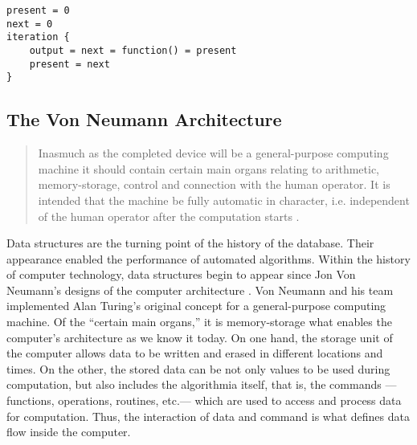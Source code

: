 \begin{flushleft}
\small
\begin{lstlisting}[caption={Pseudocode showing a routine whose next value depends on the present value.},captionpos=b,label={lst:neumann}]
present = 0
next = 0
iteration {
	output = next = function() = present
	present = next
}
\end{lstlisting}
\end{flushleft}


\subsection{The Von Neumann Architecture}

\begin{quote}
	Inasmuch as the completed device will be a general-purpose computing machine it should contain certain main organs relating to arithmetic, memory-storage, control and connection with the human operator. It is intended that the machine be fully automatic in character, i.e. independent of the human operator after the computation starts \parencite[1]{von46:Pre}.
\end{quote}

Data structures are the turning point of the history of the database. Their appearance enabled the performance of automated algorithms. Within the history of computer technology, data structures begin to appear since Jon Von Neumann's designs of the computer architecture \parencite{von46:Pre}. Von Neumann and his team implemented Alan Turing's original concept for a general-purpose computing machine. Of the ``certain main organs,'' it is memory-storage what enables the computer's architecture as we know it today. On one hand, the storage unit of the computer allows data to be written and erased in different locations and times. On the other, the stored data can be not only values to be used during computation, but also includes the algorithmia itself, that is, the commands ---functions, operations, routines, etc.--- which are used to access and process data for computation. Thus, the interaction of data and command is what defines data flow inside the computer.

